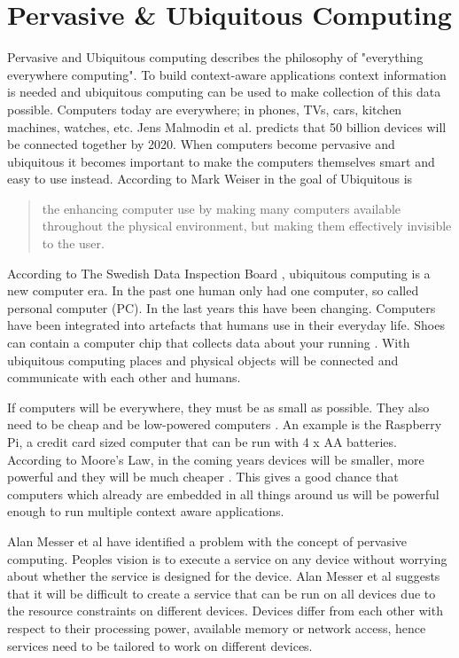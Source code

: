 \section{Pervasive \& Ubiquitous Computing}
Pervasive and Ubiquitous computing describes the philosophy of "everything everywhere computing". To build context-aware applications context information is needed and ubiquitous computing can be used to make collection of this data possible.
Computers today are everywhere; in phones, TVs, cars, kitchen machines, watches, etc. Jens Malmodin et al. \cite{fehske2011global} predicts that 50 billion devices will be connected together by 2020. When computers become pervasive and ubiquitous it becomes important to make the computers themselves smart and easy to use instead. According to Mark Weiser in \cite{237456} the goal of Ubiquitous is 

\begin{quotation}
\centering
[...] the enhancing computer use by making many computers available throughout the physical environment, but making them effectively invisible to the user.
\end{quotation}

According to The Swedish Data Inspection Board \cite{datainspect}, ubiquitous computing is a new computer era. In the past one human only had one computer, so called personal computer (PC). In the last years this have been changing. Computers have been integrated into artefacts that humans use in their everyday life. Shoes can contain a computer chip that collects data about your running \cite{saponas2006devices}. With ubiquitous computing places and physical objects will be connected and communicate with each other and humans. 

If computers will be everywhere, they must be as small as possible. They also need to be cheap and be low-powered computers \cite{datainspect}. An example is the Raspberry Pi, a credit card sized computer that can be run with 4 x AA batteries. According to Moore's Law, in the coming years devices will be smaller, more powerful and they will be much cheaper \cite{591665}. This gives a good chance that computers which already are embedded in all things around us will be powerful enough to run multiple context aware applications.

Alan Messer et al \cite{alanmesser} have identified a problem with the concept of pervasive computing. Peoples vision is to execute a service on any device without worrying about whether the service is designed for the device. Alan Messer et al suggests that it will be difficult to create a service that can be run on all devices due to the resource constraints on different devices. Devices differ from each other with respect to their processing power, available memory or network access, hence services need to be tailored to work on different devices.


